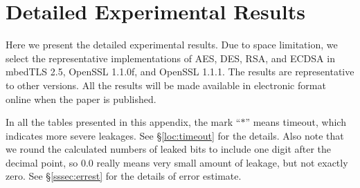 \section{Detailed Experimental Results}
\label{sec:result-table}

Here we present the detailed experimental results.
Due to space limitation, we select the representative implementations of
AES, DES, RSA, and ECDSA in
mbedTLS 2.5,
OpenSSL 1.1.0f,  and
OpenSSL 1.1.1.  
The results are representative to other versions.
All the results will be made available in electronic format online
when the paper is published. %

In all the tables presented in this appendix, the mark ``$*$'' means timeout,
which indicates more severe leakages. See \S\ref{loc:timeout} for the details.
Also note that we round the calculated numbers of leaked bits to include one digit
after the decimal point, so $0.0$ really means very small amount of leakage, 
but not exactly zero. See \S\ref{sssec:errest} for the details of error estimate.

 
 
 
 
 
 
 
 
 
 
 
 

 

 

 
 

